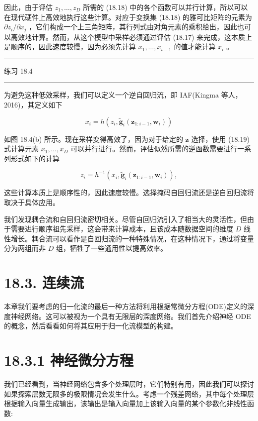 \documentclass[10pt]{article}
\newcommand{\HRule}{\begin{center}\rule{0.9\linewidth}{0.2mm}\end{center}}
\begin{document}
因此，由于评估 \({z}_{1},\ldots ,{z}_{D}\) 所需的 (18.18) 中的各个函数可以并行计算，所以可以在现代硬件上高效地执行这些计算。对应于变换集 (18.18) 的雅可比矩阵的元素为 \(\partial {z}_{i}/\partial {x}_{j}\) ，它们构成一个上三角矩阵，其行列式由对角元素的乘积给出，因此也可以高效地计算。然而，从这个模型中采样必须通过评估 (18.17) 来完成，这本质上是顺序的，因此速度较慢，因为必须先计算 \({x}_{1},\ldots ,{x}_{i - 1}\) 的值才能计算 \({x}_{i}\) 。

\HRule

练习 18.4

\HRule

为避免这种低效采样，我们可以定义一个逆自回归流，即 IAF(Kingma 等人，2016)，其定义如下

\[
{x}_{i} = h\left( {{z}_{i},{\widetilde{\mathbf{g}}}_{i}\left( {{\mathbf{z}}_{1 : i - 1},{\mathbf{w}}_{i}}\right) }\right)  \tag{18.19}
\]

如图 18.4(b) 所示。现在采样变得高效了，因为对于给定的 \(\mathbf{z}\) 选择，使用 (18.19) 式计算元素 \({x}_{1},\ldots ,{x}_{D}\) 可以并行进行。然而，评估似然所需的逆函数需要进行一系列形式如下的计算

\[
{z}_{i} = {h}^{-1}\left( {{x}_{i},{\widetilde{\mathbf{g}}}_{i}\left( {{\mathbf{z}}_{1 : i - 1},{\mathbf{w}}_{i}}\right) }\right) , \tag{18.20}
\]

这些计算本质上是顺序性的，因此速度较慢。选择掩码自回归流还是逆自回归流将取决于具体应用。

我们发现耦合流和自回归流密切相关。尽管自回归流引入了相当大的灵活性，但由于需要进行顺序祖先采样，这会带来计算成本，且该成本随数据空间的维度 \(D\) 线性增长。耦合流可以看作是自回归流的一种特殊情况，在这种情况下，通过将变量分为两组而非 \(D\) 组，牺牲了一些通用性以提高效率。

\section*{18.3. 连续流}

本章我们要考虑的归一化流的最后一种方法将利用根据常微分方程(ODE)定义的深度神经网络。这可以被视为一个具有无限层的深度网络。我们首先介绍神经 ODE 的概念，然后看看如何将其应用于归一化流模型的构建。

\section*{18.3.1 神经微分方程}

我们已经看到，当神经网络包含多个处理层时，它们特别有用，因此我们可以探讨如果探索层数无限多的极限情况会发生什么。考虑一个残差网络，其中每个处理层根据输入向量生成输出，该输出是输入向量加上该输入向量的某个参数化非线性函数:
\end{document}
